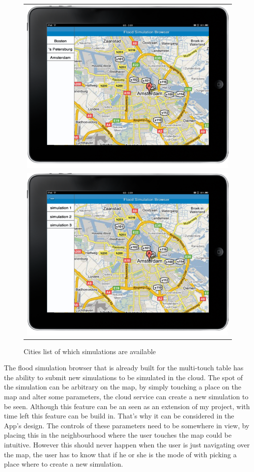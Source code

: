 \begin{figure}[H]
\center
\begin{tabular}{c}
	\includegraphics[scale=0.3]{mockup1_1.png} \\
	\includegraphics[scale=0.3]{mockup2_1.png}
\end{tabular}
\caption{Cities list of which simulations are available}
\label{fig:mockup}
\end{figure}

The flood simulation browser that is already built for the multi-touch table has the ability to submit new simulations to be simulated in the cloud. The spot of the simulation can be arbitrary on the map, by simply touching a place on the map and alter some parameters, the cloud service can create a new simulation to be seen. Although this feature can be an seen as an extension of my project, with time left this feature can be build in. That's why it can be considered in the App's design. The controls of these parameters need to be somewhere in view, by placing this in the neighbourhood where the user touches the map could be intuitive. However this should never happen when  the user is just navigating over the map, the user has to know that if he or she is the mode of with picking a place where to create a new simulation. 

